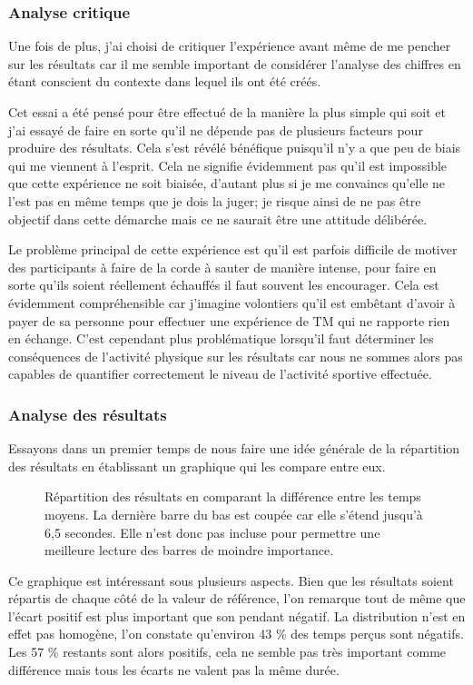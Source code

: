 \documentclass[12pt,fleqn,oneside,french,openany]{book} %
\begin{document}
\subsubsection{Analyse critique} \label{sssec:analyseCrit2.2}
Une fois de plus, j'ai choisi de critiquer l'expérience avant même de me pencher sur les résultats car il me semble important de considérer l'analyse des chiffres en étant conscient du contexte dans lequel ils ont été créés. 

Cet essai a été pensé pour être effectué de la manière la plus simple qui soit et j'ai essayé de faire en sorte qu'il ne dépende pas de plusieurs facteurs pour produire des résultats. Cela s'est révélé bénéfique puisqu'il n'y a que peu de biais qui me viennent à l'esprit. Cela ne signifie évidemment pas qu'il est impossible que cette expérience ne soit biaisée, d'autant plus si je me convaincs qu'elle ne l'est pas en même temps que je dois la juger; je risque ainsi de ne pas être objectif dans cette démarche mais ce ne saurait être une attitude délibérée.

Le problème principal de cette expérience est qu'il est parfois difficile de motiver des participants à faire de la corde à sauter de manière intense, pour faire en sorte qu'ils soient réellement échauffés il faut souvent les encourager. Cela est évidemment compréhensible car j'imagine volontiers qu'il est embêtant d'avoir à payer de sa personne pour effectuer une expérience de TM qui ne rapporte rien en échange. C'est cependant plus problématique lorsqu'il faut déterminer les conséquences de l'activité physique sur les résultats car nous ne sommes alors pas capables de quantifier correctement le niveau de l'activité sportive effectuée.

\subsubsection{Analyse des résultats} \label{sssec:analyseResult2.2}

Essayons dans un premier temps de nous faire une idée générale de la répartition des résultats en établissant un graphique qui les compare entre eux.

\begin{figure}[htp] %
	\caption{Répartition des résultats en comparant la différence entre les temps moyens. La dernière barre du bas est coupée car elle s'étend jusqu'à 6,5 secondes. Elle n'est donc pas incluse pour permettre une meilleure lecture des barres de moindre importance.}
\end{figure}
Ce graphique est intéressant sous plusieurs aspects. Bien que les résultats soient répartis de chaque côté de la valeur de référence, l'on remarque tout de même que l'écart positif est plus important que son pendant négatif. La distribution n'est en effet pas homogène, l'on constate qu'environ 43 \% des temps perçus sont négatifs. Les 57 \% restants sont alors positifs, cela ne semble pas très important comme différence mais tous les écarts ne valent pas la même durée.
\end{document}
